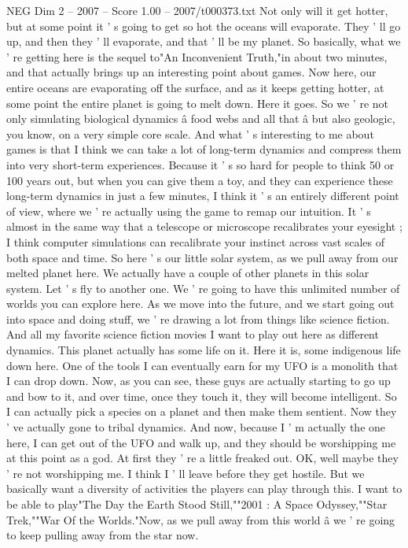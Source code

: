 \begin{textsample}{NEG Dim 2 – 2007 – Score 1.00 – 2007/t000373.txt}
Not only will it get hotter, but at some point it ' s going to get so hot the oceans will evaporate.
They ' ll go up, and then they ' ll evaporate, and that ' ll be my planet.
So basically, what we ' re getting here is the sequel to"An Inconvenient Truth,"in about two minutes, and that actually brings up an interesting point about games.
Now here, our entire oceans are evaporating off the surface, and as it keeps getting hotter, at some point the entire planet is going to melt down.
Here it goes.
So we ' re not only simulating biological dynamics â food webs and all that â but also geologic, you know, on a very simple core scale.
And what ' s interesting to me about games is that I think we can take a lot of long-term dynamics and compress them into very short-term experiences.
Because it ' s so hard for people to think 50 or 100 years out, but when you can give them a toy, and they can experience these long-term dynamics in just a few minutes, I think it ' s an entirely different point of view, where we ' re actually using the game to remap our intuition.
It ' s almost in the same way that a telescope or microscope recalibrates your eyesight ; I think computer simulations can recalibrate your instinct across vast scales of both space and time.
So here ' s our little solar system, as we pull away from our melted planet here.
We actually have a couple of other planets in this solar system.
Let ' s fly to another one.
We ' re going to have this unlimited number of worlds you can explore here.
As we move into the future, and we start going out into space and doing stuff, we ' re drawing a lot from things like science fiction.
And all my favorite science fiction movies I want to play out here as different dynamics.
This planet actually has some life on it.
Here it is, some indigenous life down here.
One of the tools I can eventually earn for my UFO is a monolith that I can drop down.
Now, as you can see, these guys are actually starting to go up and bow to it, and over time, once they touch it, they will become intelligent.
So I can actually pick a species on a planet and then make them sentient.
Now they ' ve actually gone to tribal dynamics.
And now, because I ' m actually the one here, I can get out of the UFO and walk up, and they should be worshipping me at this point as a god.
At first they ' re a little freaked out.
OK, well maybe they ' re not worshipping me.
I think I ' ll leave before they get hostile.
But we basically want a diversity of activities the players can play through this.
I want to be able to play"The Day the Earth Stood Still,""2001 : A Space Odyssey,""Star Trek,""War Of the Worlds."Now, as we pull away from this world â we ' re going to keep pulling away from the star now.

\end{textsample}
